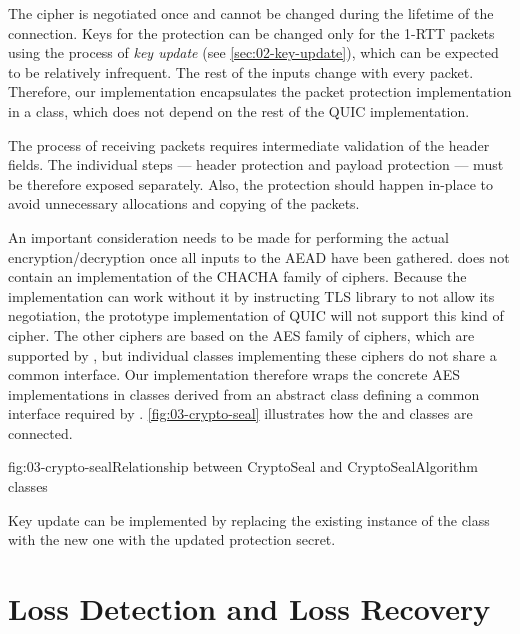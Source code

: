 The cipher is negotiated once and cannot be changed during the lifetime of the connection. Keys for
the protection can be changed only for the 1-RTT packets using the process of \textit{key update}
(see \autoref{sec:02-key-update}), which can be expected to be relatively infrequent. The rest of
the inputs change with every packet. Therefore, our implementation encapsulates the packet
protection implementation in a  class, which does not depend on the rest of the
QUIC implementation.

The process of receiving packets requires intermediate validation of the header fields. The
individual steps --- header protection and payload protection --- must be therefore exposed separately.
Also, the protection should happen in-place to avoid unnecessary allocations and copying of the
packets.

An important consideration needs to be made for performing the actual encryption/decryption once all
inputs to the AEAD have been gathered. \dotnet{} does not contain an implementation of the CHACHA
family of ciphers. Because the implementation can work without it by instructing TLS library to not
allow its negotiation, the prototype implementation of QUIC will not support this kind of cipher.
The other ciphers are based on the AES family of ciphers, which are supported by \dotnet{}, but
individual classes implementing these ciphers do not share a common interface. Our implementation
therefore wraps the concrete AES implementations in classes derived from an abstract
 class defining a common interface required by \CryptoSeal{}.
\autoref{fig:03-crypto-seal} illustrates how the \CryptoSeal{} and 
classes are connected.

\begin{myFigure}{fig:03-crypto-seal}{Relationship between CryptoSeal and CryptoSealAlgorithm classes}

  \resizebox{\linewidth}{!}{}

\end{myFigure}

Key update can be implemented by replacing the existing instance of the
\CryptoSeal{} class with the new one with the updated protection secret.

\section{Loss Detection and Loss Recovery}


